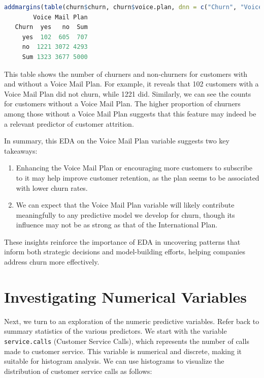 \documentclass[
]{book}
\newcommand{\passthrough}[1]{#1}
\providecommand{\tightlist}{%
  \setlength{\itemsep}{0pt}\setlength{\parskip}{0pt}}
\theoremstyle{definition}
\theoremstyle{definition}
\theoremstyle{definition}
\theoremstyle{definition}
\theoremstyle{remark}
\begin{document}
\begin{lstlisting}[language=R]
addmargins(table(churn$churn, churn$voice.plan, dnn = c("Churn", "Voice Mail Plan")))
        Voice Mail Plan
   Churn  yes   no  Sum
     yes  102  605  707
     no  1221 3072 4293
     Sum 1323 3677 5000
\end{lstlisting}

This table shows the number of churners and non-churners for customers with and without a Voice Mail Plan. For example, it reveals that 102 customers with a Voice Mail Plan did not churn, while 1221 did. Similarly, we can see the counts for customers without a Voice Mail Plan. The higher proportion of churners among those without a Voice Mail Plan suggests that this feature may indeed be a relevant predictor of customer attrition.

In summary, this EDA on the Voice Mail Plan variable suggests two key takeaways:

\begin{enumerate}
\def\labelenumi{\arabic{enumi}.}
\tightlist
\item
  Enhancing the Voice Mail Plan or encouraging more customers to subscribe to it may help improve customer retention, as the plan seems to be associated with lower churn rates.
\item
  We can expect that the Voice Mail Plan variable will likely contribute meaningfully to any predictive model we develop for churn, though its influence may not be as strong as that of the International Plan.
\end{enumerate}

These insights reinforce the importance of EDA in uncovering patterns that inform both strategic decisions and model-building efforts, helping companies address churn more effectively.

\section{Investigating Numerical Variables}\label{investigating-numerical-variables}

Next, we turn to an exploration of the numeric predictive variables. Refer back to summary statistics of the various predictors. We start with the variable \passthrough{\lstinline!service.calls!} (Customer Service Calls), which represents the number of calls made to customer service. This variable is numerical and discrete, making it suitable for histogram analysis. We can use histograms to visualize the distribution of customer service calls as follows:
\end{document}
